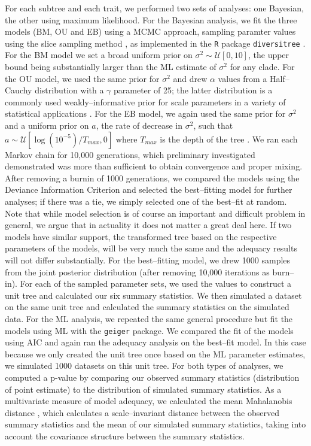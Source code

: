 \documentclass[a4paper,12pt]{article}
\begin{document}
For each subtree and each trait, we performed two sets of analyses: one Bayesian, the other using maximum likelihood. For the Bayesian analysis, we fit the three models (BM, OU and EB) using a MCMC approach, sampling paramter values using the slice sampling method \citep{Nealslice}, as implemented in the \texttt{R} package \texttt{diversitree} \citep{FitzJohn2012}. For the BM model we set a broad uniform prior on $\sigma^2 \sim \mathcal{U}[0, 10]$, the upper bound being substantially larger than the ML estimate of $\sigma^2$ for any clade. For the OU model, we used the same prior for $\sigma^2$ and drew $\alpha$ values from a Half--Cauchy distribution with a $\gamma$ parameter of 25; the latter distribution is a commonly used weakly--informative prior for scale parameters in a variety of statistical applications \citep[see][]{Gelmanprior, Polson2012}. For the EB model, we again used the same prior for $\sigma^2$ and a uniform prior on $a$, the rate of decrease in $\sigma^2$, such that $a \sim \mathcal{U}[\log (10^{-5})/T_{max}, 0]$ where $T_{max}$ is the depth of the tree \citep[for rationale, see][]{SlaterPennell}. We ran each Markov chain for 10,000 generations, which preliminary investigated demonstrated was more than sufficient to obtain convergence and proper mixing. After removing a burnin of 1000 generations, we compared the models using the Deviance Information Criterion \citep[DIC;][]{dic} and selected the best--fitting model for further analyses; if there was a tie, we simply selected one of the best--fit at random. Note that while model selection is of course an important and difficult problem in general, we argue that in actuality it does not matter a great deal here. If two models have similar support, the transformed tree based on the respective parameters of the models, will be very much the same and the adequacy results will not differ substantially. For the best--fitting model, we drew 1000 samples from the joint posterior distribution (after removing 10,000 iterations as burn--in). For each of the sampled parameter sets, we used the values to construct a unit tree and calculated our six summary statistics. We then simulated a dataset on the same unit tree and calculated the summary statistics on the simulated data. 
For the ML analysis, we repeated the same general procedure but fit the models using ML with the \texttt{geiger} \citep{geiger} package. We compared the fit of the models using AIC \citep{Akaike1974} and again ran the adequacy analysis on the best--fit model. In this case because we only created the unit tree once based on the ML parameter estimates, we simulated 1000 datasets on this unit tree. For both types of analyses, we computed a p-value by comparing our observed summary statistics (distribution of point estimate) to the distribution of simulated summary statistics. As a multivariate measure of model adequacy, we calculated the mean Mahalanobis distance \citep{mahalanobis1936}, which calculates a scale--invariant distance between the observed summary statistics and the mean of our simulated summary statistics, taking into account the covariance structure between the summary statistics.
\end{document}
